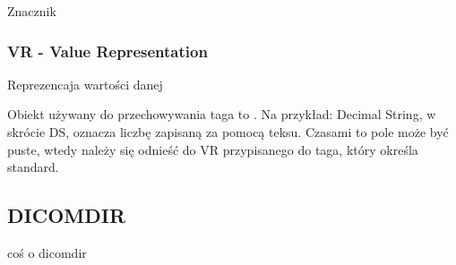 Znacznik


\subsubsection{VR - Value Representation}
\label{sec:dicom-vr}

Reprezencaja wartości danej

Obiekt używany do przechowywania taga to .
Na przykład: Decimal String, w skrócie DS, oznacza liczbę zapisaną za pomocą teksu.
Czasami to pole może być puste, wtedy należy się odnieść do VR przypisanego do taga, który określa standard.

\subsection{DICOMDIR}

coś o dicomdir
